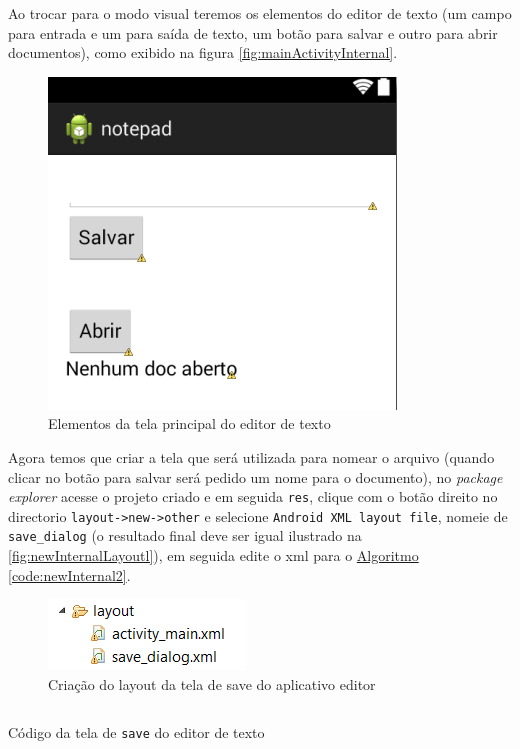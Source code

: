 \documentclass[a4paper,12pt,brazil,oneside]{book}
\begin{document}
		Ao trocar para o modo visual teremos os elementos do editor de texto (um campo para entrada e um para saída de texto, um botão para salvar e outro para abrir documentos), como exibido na figura \autoref{fig:mainActivityInternal}.
		
		\begin{figure}[H]
  \centering
  \includegraphics[width=.4\textwidth]{figuras/api/internal/mainActivity.png}
  \caption{Elementos da tela principal do editor de texto}
  \label{fig:mainActivityInternal}
\end{figure}
		
		Agora temos que criar a tela que será utilizada para nomear o arquivo (quando clicar no botão para salvar será pedido um nome para o documento), no \emph{package explorer} acesse o projeto criado e em seguida \texttt{res}, clique com o botão direito no directorio \texttt{layout->new->other} e selecione \texttt{Android XML layout file}, nomeie de \texttt{save\_dialog} (o resultado final deve ser igual ilustrado na \autoref{fig:newInternalLayoutl}), em seguida edite o xml para o \hyperref[code:newInternal2]{Algoritmo \ref*{code:newInternal2}}.
		
				\begin{figure}[H]
  \centering
  \includegraphics[width=.3\textwidth]{figuras/api/internal/layout.png}
  \caption{Criação do layout da tela de save do aplicativo editor}
  \label{fig:newInternalLayoutl}
\end{figure}
		
		\begin{listing}[H]
		\inputminted[linenos=true,fontsize=\small,frame=lines, framesep=2mm, tabsize=2,numbersep=5pt]{java}{src/api/storage/newInternal2.xml}
		\caption{Código da tela de \texttt{save} do editor de texto}
		\label{code:newInternal2}
		\end{listing} 	
		
\end{document}
